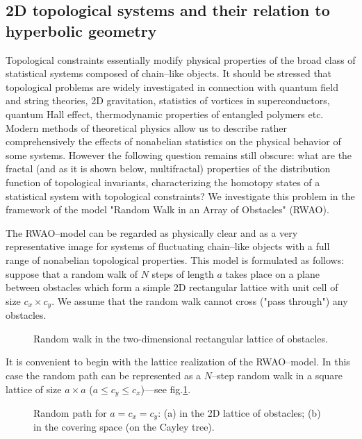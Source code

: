 \subsection{2D topological systems and their relation to hyperbolic
geometry} \label{1:sect:2.1}

Topological constraints essentially modify physical properties of
the broad class of statistical systems composed of chain--like objects. It should be stressed that topological problems
are widely investigated in connection with quantum field and string
theories, 2D gravitation, statistics of vortices in superconductors,
quantum Hall effect, thermodynamic properties of entangled polymers etc.
Modern methods of theoretical physics allow us to describe rather
comprehensively  the effects of nonabelian statistics on the physical behavior
of some systems. However the following
question remains still  obscure: what are the fractal (and as it is
shown below, multifractal) properties of the distribution function of
topological invariants, characterizing the homotopy states of a
statistical system with topological constraints? We investigate this problem
in the framework of the model "Random Walk in an Array of Obstacles" (RWAO).

The RWAO--model can be regarded as physically clear  and as a very representative
image for systems of fluctuating chain--like objects with a full range
of nonabelian topological properties. This model is formulated as follows: suppose that  a  random walk of $N$ steps of length $a$ takes place on a  plane
between obstacles which form a simple 2D rectangular lattice with 
unit cell of size $c_x \times c_y$. We assume that the random
walk cannot cross ("pass through") any obstacles.
\begin{figure}
\centerline{}
\caption{Random walk in the two-dimensional rectangular lattice of obstacles.}
\label{1:fig:1}
\end{figure}

It is convenient to begin with the lattice realization of the RWAO--model.
In this case the random path can be represented as a $N$--step random walk
in a square lattice of size $a\times a$ ($a\le c_y\le
c_x$)---see fig.\ref{1:fig:1}.

\begin{figure}
\centerline{}
\caption{Random path for $a=c_x=c_y$: (a) in the 2D lattice of
obstacles; (b) in the covering space (on the Cayley tree).}
\label{1:fig:2}
\end{figure}

